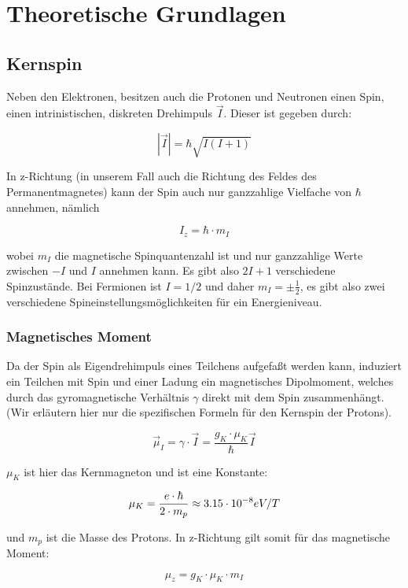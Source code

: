 \section{Theoretische Grundlagen}

\subsection{Kernspin}

Neben den Elektronen, besitzen auch die Protonen und Neutronen einen Spin, einen intrinistischen, diskreten Drehimpuls $\vec I$. Dieser ist gegeben durch:

$$ |\vec I| = \hbar \sqrt{I(I+1)} $$

In z-Richtung (in unserem Fall auch die Richtung des Feldes des Permanentmagnetes) kann der Spin auch nur ganzzahlige Vielfache von $\hbar$ annehmen, nämlich

$$I_z = \hbar\cdot m_I$$

wobei $m_I$ die magnetische Spinquantenzahl ist und nur ganzzahlige Werte zwischen $-I$ und $I$ annehmen kann. Es gibt also $2I+1$ verschiedene Spinzustände. Bei Fermionen ist $I=1/2$ und daher $m_I = \pm\frac{1}{2}$, es gibt also zwei verschiedene Spineinstellungsmöglichkeiten für ein Energieniveau.

\subsubsection{Magnetisches Moment}

Da der Spin als Eigendrehimpuls eines Teilchens aufgefaßt werden kann, induziert ein Teilchen mit Spin und einer Ladung ein magnetisches Dipolmoment, welches durch das gyromagnetische Verhältnis $\gamma$ direkt mit dem Spin zusammenhängt. (Wir erläutern hier nur die spezifischen Formeln für den Kernspin der Protons).

\begin{equation} \vec \mu_I = \gamma\cdot\vec I = \frac{g_K\cdot\mu_K}{\hbar}\vec I \end{equation}

$\mu_K$ ist hier das Kernmagneton und ist eine Konstante:

$$\mu_K = \frac{e\cdot \hbar}{2\cdot m_p} \approx 3.15\cdot 10^{-8} eV/T$$

und $m_p$ ist die Masse des Protons. In z-Richtung gilt somit für das magnetische Moment:

\begin{equation} \mu_z = g_K \cdot \mu_K \cdot m_I \label{muz} \end{equation}

